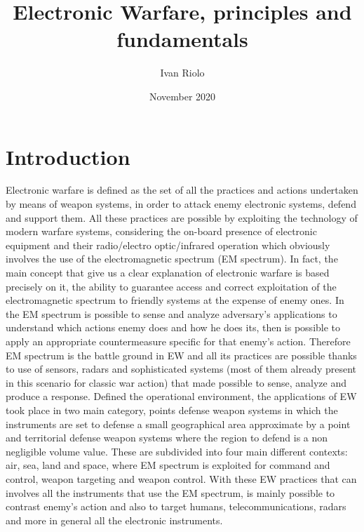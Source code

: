 \documentclass[12pt]{report}
\title{Electronic Warfare, principles and fundamentals}
\author{Ivan Riolo}
\date{November 2020}
\begin{document}
\maketitle
\tableofcontents


\chapter{Introduction} 
Electronic warfare is defined as the set of all the practices and actions undertaken by means of weapon systems, in order to attack enemy electronic systems, defend and support them.
All these practices are possible by exploiting the technology of modern warfare systems, considering the on-board presence of electronic equipment and their radio/electro optic/infrared operation which obviously involves the use of the electromagnetic spectrum (EM spectrum). In fact, the main concept that give us a clear explanation of electronic warfare is based precisely on it, the ability to guarantee access and correct exploitation of the electromagnetic spectrum to friendly systems at the expense of enemy ones. In the EM spectrum is possible to sense and analyze adversary's applications to understand which actions enemy does and how he does its, then is possible to apply an appropriate countermeasure specific for that enemy's action. Therefore EM spectrum is the battle ground in EW and all its practices are possible thanks to use of sensors, radars and sophisticated systems (most of them already present in this scenario for classic war action) that made possible to sense, analyze and produce a response. Defined the operational environment, the applications of EW took place in two main category, points defense weapon systems in which the instruments are set to defense a small geographical area approximate by a point and territorial defense weapon systems where the region to defend is a non negligible volume value. These are subdivided into four main different contexts: air, sea, land and space, where EM spectrum is exploited for command and control, weapon targeting and weapon control. With these EW practices that can involves all the instruments that use the EM spectrum, is mainly possible to contrast enemy's action and also to target humans, telecommunications, radars and more in general all the electronic instruments. 
\end{document}
